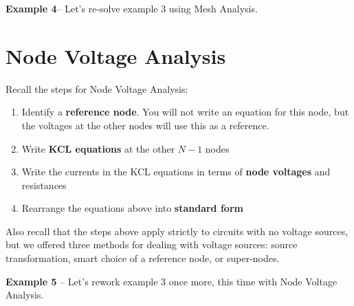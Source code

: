 \documentclass{handout}
\begin{document}
\textbf{Example 4}-- Let's re-solve example 3 using Mesh Analysis.

\newpage
\clearpage
\pagebreak

\section{Node Voltage Analysis}
Recall the steps for Node Voltage Analysis:
\begin{enumerate}
\item Identify a \textbf{reference node}.  You will not write an equation for this node, but the voltages at the other nodes will use this as a reference.
\item Write \textbf{KCL equations} at the other $N-1$ nodes
\item Write the currents in the KCL equations in terms of \textbf{node voltages} and resistances
\item Rearrange the equations above into \textbf{standard form}
\end{enumerate}

Also recall that the steps above apply strictly to circuits with no voltage sources, but we offered three methods for dealing with voltage sources: source transformation, smart choice of a reference node, or super-nodes.

\textbf{Example 5} -- Let's rework example 3 once more, this time with Node Voltage Analysis.






\newpage
\clearpage
\pagebreak
%
%
%
%
%
\end{document}
